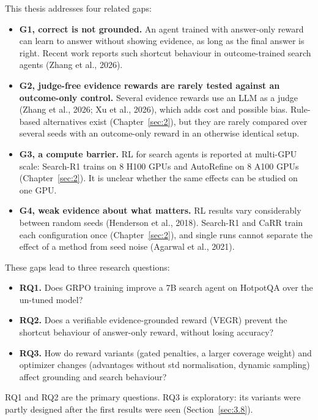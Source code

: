 This thesis addresses four related gaps:

\begin{itemize}
\tightlist
\item
  \textbf{G1, correct is not grounded.} An agent trained with
  answer-only reward can learn to answer without showing evidence, as
  long as the final answer is right. Recent work reports such shortcut
  behaviour in outcome-trained search agents (Zhang et al., 2026).
\item
  \textbf{G2, judge-free evidence rewards are rarely tested against an
  outcome-only control.} Several evidence rewards use an LLM as a judge
  (Zhang et al., 2026; Xu et al., 2026), which adds cost and possible
  bias. Rule-based alternatives exist (Chapter~\ref{sec:2}), but they
  are rarely compared over several seeds with an outcome-only reward in
  an otherwise identical setup.
\item
  \textbf{G3, a compute barrier.} RL for search agents is reported at
  multi-GPU scale: Search-R1 trains on 8 H100 GPUs and AutoRefine on 8
  A100 GPUs (Chapter~\ref{sec:2}). It is unclear whether the same
  effects can be studied on one GPU.
\item
  \textbf{G4, weak evidence about what matters.} RL results vary
  considerably between random seeds (Henderson et al., 2018). Search-R1
  and CaRR train each configuration once (Chapter~\ref{sec:2}), and
  single runs cannot separate the effect of a method from seed noise
  (Agarwal et al., 2021).
\end{itemize}

These gaps lead to three research questions:

\begin{itemize}
\tightlist
\item
  \textbf{RQ1.} Does GRPO training improve a 7B search agent on HotpotQA
  over the un-tuned model?
\item
  \textbf{RQ2.} Does a verifiable evidence-grounded reward (VEGR)
  prevent the shortcut behaviour of answer-only reward, without losing
  accuracy?
\item
  \textbf{RQ3.} How do reward variants (gated penalties, a larger
  coverage weight) and optimizer changes (advantages without std
  normalisation, dynamic sampling) affect grounding and search
  behaviour?
\end{itemize}

RQ1 and RQ2 are the primary questions. RQ3 is exploratory: its variants
were partly designed after the first results were seen
(Section~\ref{sec:3.8}).

